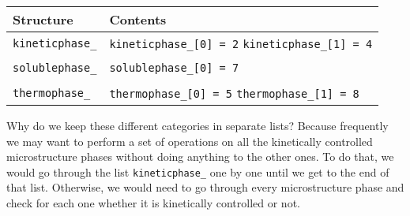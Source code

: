 \documentclass{article}
\begin{document}
\scriptsize{
\begin{tabular}{l p{4.0in}} \toprule
\textbf{Structure} & \textbf{Contents} \\ \midrule
\verb!kineticphase_! & \verb!kineticphase_[0] = 2! \hspace{0.1in} 
                 \verb!kineticphase_[1] = 4! \\
                 & \\
\verb!solublephase_! & \verb!solublephase_[0] = 7! \\
                 & \\
\verb!thermophase_! & \verb!thermophase_[0] = 5! \hspace{0.1in}
                 \verb!thermophase_[1] = 8! \\ \bottomrule
\end{tabular}
}

\normalsize{ }
Why do we keep these different categories in separate lists? Because
frequently we may want to perform a set of operations on all the kinetically controlled
microstructure phases without doing anything to the other ones.  To do that, we would
go through the list \verb!kineticphase_! one by one until we get to the end of that list.
Otherwise, we would need to go through every microstructure phase and check for each
one whether it is kinetically controlled or not.
\end{document}
